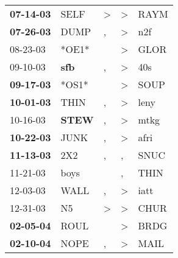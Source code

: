 \begin{supertabular}{p{0.07\textwidth}p{0.06\textwidth}p{0.02\textwidth}p{0.02\textwidth}p{0.06\textwidth}}
 \textbf{07-14-03\textsuperscript{}} &           SELF\textsuperscript{} &     \textgreater &     \textgreater &           RAYM\textsuperscript{} \\
 \textbf{07-26-03\textsuperscript{}} &           DUMP\textsuperscript{} &                , &     \textgreater &            n2f\textsuperscript{} \\
          08-23-03\textsuperscript{} &                            *OE1* &                  &     \textgreater &           GLOR\textsuperscript{} \\
          09-10-03\textsuperscript{} &   \textbf{sfb\textsuperscript{}} &                , &     \textgreater &            40s\textsuperscript{} \\
 \textbf{09-17-03\textsuperscript{}} &                            *OS1* &                  &     \textgreater &           SOUP\textsuperscript{} \\
 \textbf{10-01-03\textsuperscript{}} &           THIN\textsuperscript{} &                , &     \textgreater &           leny\textsuperscript{} \\
          10-16-03\textsuperscript{} &  \textbf{STEW\textsuperscript{}} &                , &     \textgreater &           mtkg\textsuperscript{} \\
 \textbf{10-22-03\textsuperscript{}} &           JUNK\textsuperscript{} &                , &     \textgreater &           afri\textsuperscript{} \\
 \textbf{11-13-03\textsuperscript{}} &            2X2\textsuperscript{} &                , &                , &           SNUC\textsuperscript{} \\
          11-21-03\textsuperscript{} &           boys\textsuperscript{} &                  &                , &           THIN\textsuperscript{} \\
          12-03-03\textsuperscript{} &           WALL\textsuperscript{} &                , &     \textgreater &           iatt\textsuperscript{} \\
          12-31-03\textsuperscript{} &             N5\textsuperscript{} &     \textgreater &     \textgreater &           CHUR\textsuperscript{} \\
 \textbf{02-05-04\textsuperscript{}} &           ROUL\textsuperscript{} &                  &     \textgreater &           BRDG\textsuperscript{} \\
 \textbf{02-10-04\textsuperscript{}} &           NOPE\textsuperscript{} &                , &     \textgreater &           MAIL\textsuperscript{} \\

\end{supertabular}
